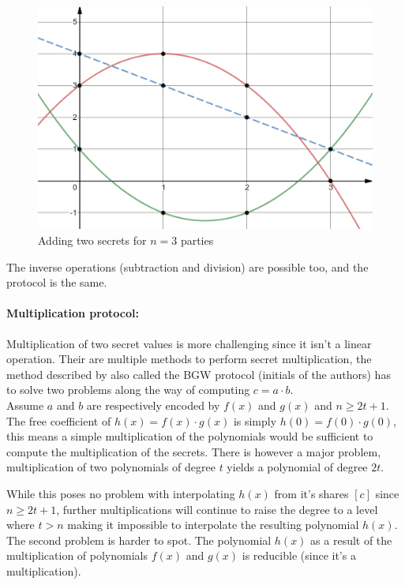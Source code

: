 \begin{figure}
  \includegraphics[width=\linewidth]{plots/addsecrets.png}
  \caption{Adding two secrets for $n=3$ parties}
  \label{fig:addsecrets}
\end{figure}

The inverse operations (subtraction and division) are possible too, and the protocol is the same.

\paragraph{Multiplication protocol:}
Multiplication of two secret values is more challenging since it isn't a linear operation. Their are multiple methods to perform secret multiplication, the method described by \cite{ben1988completeness} also called the BGW protocol (initials of the authors) has to solve two problems along the way of computing $c = a \cdot b$.\\

Assume $a$ and $b$ are respectively encoded by $f(x)$ and $g(x)$ and $n \geq 2t + 1$. The free coefficient of $h(x) = f(x) \cdot g(x)$ is simply $h(0) = f(0) \cdot g(0)$, this means a simple multiplication of the polynomials would be sufficient to compute the multiplication of the secrets. There is however a major problem, multiplication of two polynomials of degree $t$ yields a polynomial of degree $2t$.

While this poses no problem with interpolating $h(x)$ from it's shares $[c]$ since $n \geq 2t + 1$, further multiplications will continue to raise the degree to a level where $t>n$ making it impossible to interpolate the resulting polynomial $h(x)$. The second problem is harder to spot.
The polynomial $h(x)$ as a result of the multiplication of polynomials $f(x)$ and $g(x)$ is reducible (since it's a multiplication).

